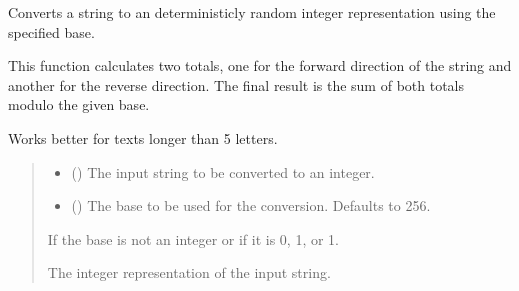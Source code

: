 \documentclass[letterpaper,10pt,english]{sphinxmanual}
\begin{document}
\begin{fulllineitems}
\label{\detokenize{generated/eflatun_uav.helpers.number_generators:eflatun_uav.helpers.number_generators.convert_string_to_int}}
\pysigstartsignatures
{}
\pysigstopsignatures
\sphinxAtStartPar
Converts a string to an deterministicly random integer representation using the specified base.

\sphinxAtStartPar
This function calculates two totals, one for the forward direction of the string
and another for the reverse direction. The final result is the sum of both totals
modulo the given base.

\sphinxAtStartPar
Works better for texts longer than 5 letters.
\begin{quote}\begin{description}
\begin{itemize}
\item {} 
\sphinxAtStartPar
{} () \textendash{} The input string to be converted to an integer.

\item {} 
\sphinxAtStartPar
{} (\sphinxstyleliteralemphasis{\sphinxupquote{{[}}}\sphinxstyleliteralemphasis{\sphinxupquote{{]}}}\sphinxstyleliteralemphasis{\sphinxupquote{, }}) \textendash{} The base to be used for the conversion. Defaults to 256.

\end{itemize}

\sphinxAtStartPar
{} \textendash{} If the base is not an integer or if it is 0, \sphinxhyphen{}1, or 1.

\sphinxAtStartPar
The integer representation of the input string.


\end{description}
\end{quote}
\end{fulllineitems}
\end{document}
